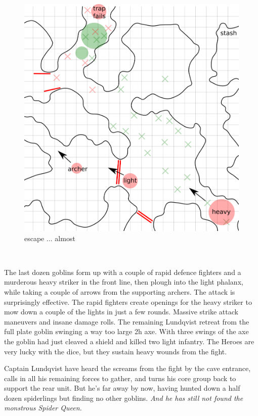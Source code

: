 \begin{figure}    %
\centering
\includegraphics[width=0.9\linewidth]{./fig/hool2lundqvistresult4-zoom.png}
\caption*{escape ... almost}
\end{figure}

\

The last dozen goblins form up with a couple of rapid defence fighters and a murderous heavy striker in the front line, then plough into the light phalanx, while taking a couple of arrows from the supporting archers.
The attack is surprisingly effective. The rapid fighters create openings for the heavy striker to mow down a couple of the lights in just a few rounds. Massive strike attack maneuvers and insane damage rolls. The remaining Lundqvist retreat from the full plate goblin swinging a way too large 2h axe. With three swings of the axe the goblin had just cleaved a shield and killed two light infantry. The Heroes are very lucky with the dice, but they sustain heavy wounds from the fight.

Captain Lundqvist have heard the screams from the fight by the cave entrance, calls in all his remaining forces to gather, and turns his core group back to support the rear unit. But he's far away by now, having hunted down a half dozen spiderlings but finding no other goblins. \textit{And he has still not found the monstrous Spider Queen.}

